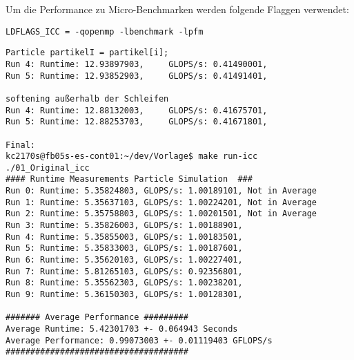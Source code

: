\documentclass{article}
\begin{document}
Um die Performance zu Micro-Benchmarken werden folgende Flaggen verwendet:
\begin{verbatim}
LDFLAGS_ICC = -qopenmp -lbenchmark -lpfm
\end{verbatim}

\begin{verbatim}
Particle partikelI = partikel[i];
Run 4: Runtime: 12.93897903,     GLOPS/s: 0.41490001,    
Run 5: Runtime: 12.93852903,     GLOPS/s: 0.41491401, 

softening außerhalb der Schleifen
Run 4: Runtime: 12.88132003,     GLOPS/s: 0.41675701,    
Run 5: Runtime: 12.88253703,     GLOPS/s: 0.41671801,

Final: 
kc2170s@fb05s-es-cont01:~/dev/Vorlage$ make run-icc
./01_Original_icc
#### Runtime Measurements Particle Simulation  ###
Run 0: Runtime: 5.35824803, GLOPS/s: 1.00189101, Not in Average
Run 1: Runtime: 5.35637103, GLOPS/s: 1.00224201, Not in Average
Run 2: Runtime: 5.35758803, GLOPS/s: 1.00201501, Not in Average
Run 3: Runtime: 5.35826003, GLOPS/s: 1.00188901,    
Run 4: Runtime: 5.35855003, GLOPS/s: 1.00183501,    
Run 5: Runtime: 5.35833003, GLOPS/s: 1.00187601,    
Run 6: Runtime: 5.35620103, GLOPS/s: 1.00227401,    
Run 7: Runtime: 5.81265103, GLOPS/s: 0.92356801,    
Run 8: Runtime: 5.35562303, GLOPS/s: 1.00238201,    
Run 9: Runtime: 5.36150303, GLOPS/s: 1.00128301,    

####### Average Performance #########
Average Runtime: 5.42301703 +- 0.064943 Seconds 
Average Performance: 0.99073003 +- 0.01119403 GFLOPS/s 
#####################################
\end{verbatim}
\end{document}
